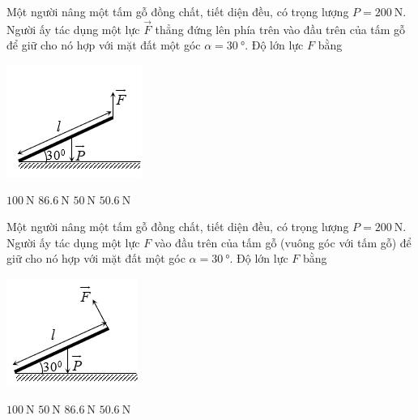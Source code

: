 \begin{ex}
Một người nâng một tấm gỗ đồng chất, tiết diện đều, có trọng lượng $P=\SI{200}{\newton}$. Người ấy tác dụng một lực $\vec F$ thẳng đứng lên phía trên vào đầu trên của tấm gỗ để giữ cho nó hợp với mặt đất một góc $\alpha=\SI{30}{\degree}$. Độ lớn lực $F$ bằng	
\begin{center}
	\includegraphics[width=0.25\linewidth]{../figs/VN10-2023-PH-TP0005-5}
\end{center}
	\choice
	{\True $\SI{100}{\newton}$}
	{$\SI{86.6}{\newton}$}
	{$\SI{50}{\newton}$}
	{$\SI{50.6}{\newton}$}
\end{ex}
\begin{ex}
	Một người nâng một tấm gỗ đồng chất, tiết diện đều, có trọng lượng $P=\SI{200}{\newton}$. Người ấy tác dụng một lực $F$ vào đầu trên của tấm gỗ (vuông góc với tấm gỗ) để giữ cho nó hợp với mặt đất một góc $\alpha=\SI{30}{\degree}$. Độ lớn lực $F$ bằng 
	\begin{center}
		\includegraphics[width=0.25\linewidth]{../figs/VN10-2023-PH-TP0005-6}
	\end{center}
	\choice
	{$\SI{100}{\newton}$}
	{$\SI{50}{\newton}$}
	{\True $\SI{86.6}{\newton}$}
	{$\SI{50.6}{\newton}$}
\end{ex}
